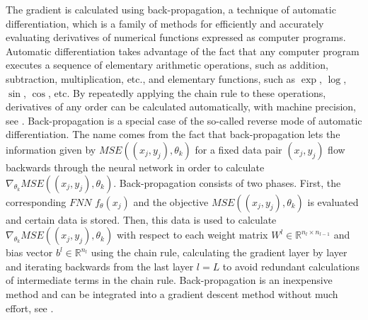 The gradient is calculated using back-propagation, a technique of automatic differentiation, which is a family of methods for efficiently and accurately evaluating derivatives of numerical functions expressed as computer programs. Automatic differentiation takes advantage of the fact that any computer program executes a sequence of elementary arithmetic operations, such as addition, subtraction, multiplication, etc., and elementary functions, such as $\exp$, $\log$, $\sin$, $\cos$, etc. By repeatedly applying the chain rule to these operations, derivatives of any order can be calculated automatically, with machine precision, see \cite{BaydinPearlmutterAndreyevich:2018}. Back-propagation is a special case of the so-called reverse mode of automatic differentiation. The name comes from the fact that back-propagation lets the information given by $MSE((x_j, y_j), \theta_k)$ for a fixed data pair $(x_j, y_j)$ flow backwards through the neural network in order to calculate $\nabla_{\theta_k} MSE((x_j, y_j), \theta_k)$. Back-propagation consists of two phases. First, the corresponding $FNN$ $f_{\theta} \left(x_{j}\right)$ and the objective $MSE((x_j, y_j), \theta_k)$ is evaluated and certain data is stored. Then, this data is used to calculate $\nabla_{\theta_k} MSE((x_j, y_j), \theta_k)$ with respect to each weight matrix $W^l \in \mathbb{R}^{n_l \times n_{l-1}}$ and bias vector $b^l \in \mathbb{R}^{n_l}$ using the chain rule, calculating the gradient layer by layer and iterating backwards from the last layer $l=L$ to avoid redundant calculations of intermediate terms in the chain rule. Back-propagation is an inexpensive method and can be integrated into a gradient descent method without much effort, see \cite[section~6.5]{GoodfellowBengioCourville:2016}.\\

